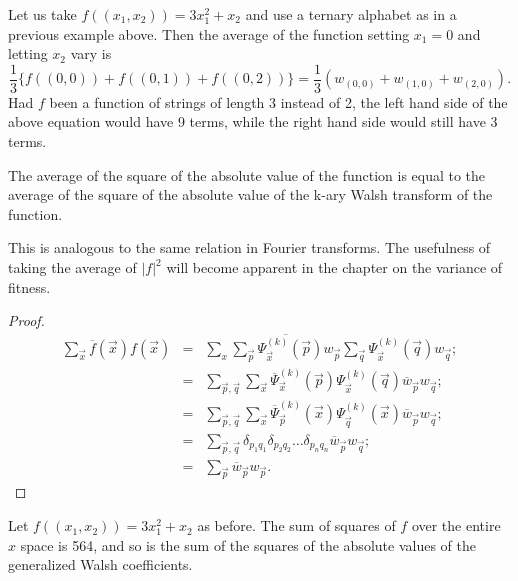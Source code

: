 \begin{example}
Let us take $f((x_1,x_2))=3 x_1^2+x_2$ and use a ternary alphabet as in 
a previous example above.  Then the average of the function setting $x_1=0$
and letting $x_2$ vary is
\begin{equation}
\frac{1}{3}\{f((0,0))+f((0,1))+f((0,2))\}=\frac{1}{3}(w_{(0,0)}+w_{(1,0)}+w_{(2,0)}).
\end{equation}
Had $f$ been a function of strings of length 3 instead of 2, the left hand
side of the above equation would have 9 terms, while the right hand side
would still have 3 terms.
\end{example}

\begin{theorem}
The average of the square of the absolute value of the function is
equal to the average of the square of the absolute value of the k-ary Walsh
transform of the function.
\end{theorem}
This is analogous to the same relation in
Fourier transforms.  The usefulness of taking the average of $|f|^2$ will
become apparent in the chapter on the variance of fitness.

\begin{proof}
\begin{eqnarray}
\sum_{\vec x}{\overline{f}(\vec x) f(\vec x)}&=& 
	\sum_x{\overline{\sum_{\vec p}{\Psi^{(k)}_{\vec x}(\vec p) w_{\vec p}}}
		\sum_{\vec q}{\Psi^{(k)}_{\vec x}(\vec q) w_{\vec q}}}; \nonumber \\
	&=& \sum_{\vec p,\vec q}\sum_{\vec x} {\overline{\Psi}^{(k)}_{\vec x}(\vec p)
		\Psi^{(k)}_{\vec x}(\vec q)
		\overline{w}_{\vec p} w_{\vec q} }; \nonumber \\
	&=& \sum_{\vec p,\vec q}\sum_{\vec x} {\overline{\Psi}^{(k)}_{\vec p}{(\vec x)}
		\Psi^{(k)}_{\vec q}(\vec x)
		\overline{w}_{\vec p} w_{\vec q} }; \nonumber \\
	&=& \sum_{\vec p,\vec q} \delta_{p_1q_1}\delta_{p_2q_2}\ldots\delta_{p_nq_n} \overline{w}_{\vec p} w_{\vec q} ;\nonumber\\
	&=& \sum_{\vec p} \overline{w}_{\vec p} w_{\vec p}.
		\label{varone}
\end{eqnarray}
\end{proof}

\begin{example}
Let $f((x_1,x_2))= 3x_1^2+x_2$ as before.  The sum of squares of $f$ over
the entire $x$ space is 564, and so is the sum of the squares of the
absolute values of the generalized Walsh coefficients.
\end{example}

